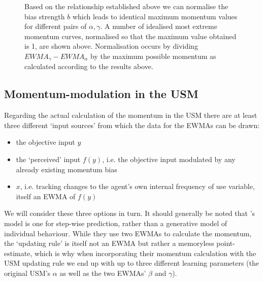 \begin{knitrout}
\color{fgcolor}\begin{figure}[H]

{\centering {}

}

\caption[Based on the relationship established above we can normalise the bias strength ]{Based on the relationship established above we can normalise the bias strength $b$ which leads to identical maximum momentum values for different pairs of $\alpha,\gamma$. A number of idealised most extreme momentum curves, normalised so that the maximum value obtained is 1, are shown above. Normalisation occurs by dividing $EWMA_\gamma-EWMA_\alpha$ by the maximum possible momentum as calculated according to the results above.}\label{fig:identicalbiases}
\end{figure}


\end{knitrout}


\subsection{Momentum-modulation in the USM}

Regarding the actual calculation of the momentum in the USM there are at least three different `input sources' from which the data for the EWMAs can be drawn:

\begin{itemize}
\item the objective input $y$
\item the `perceived' input $f(y)$, i.e. the objective input modulated by any already existing momentum bias
\item $x$, i.e. tracking changes to the agent's own internal frequency of use variable, itself an EWMA of $f(y)$
\end{itemize}

We will consider these three options in turn. It should generally be noted that \citet{Gureckis2009}'s model is one for step-wise prediction, rather than a generative model of individual behaviour. While they use two EWMAs to calculate the momentum, the `updating rule' is itself not an EWMA but rather a memoryless point-estimate, which is why when incorporating their momentum calculation with the USM updating rule we end up with up to three different learning parameters (the original USM's $\alpha$ as well as the two EWMAs' $\beta$ and $\gamma$).

